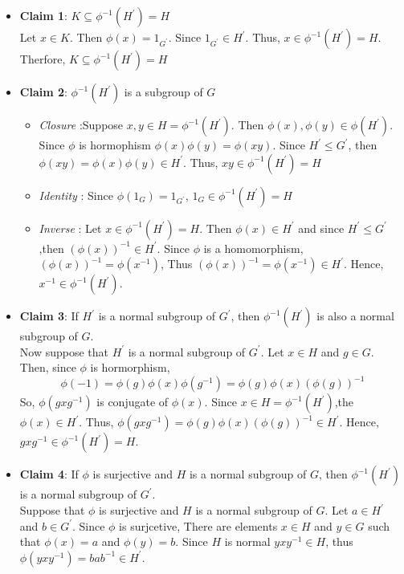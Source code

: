 \documentclass[
]{book}
\providecommand{\tightlist}{%
  \setlength{\itemsep}{0pt}\setlength{\parskip}{0pt}}
\begin{document}
\begin{itemize}
\tightlist
\item
  \textbf{Claim 1}: \(K\subseteq \phi^{-1}(H^\prime)=H\)\\
  Let \(x\in K\). Then \(\phi(x)=1_{G^\prime}\). Since
  \(1_{G^\prime}\in H^\prime\). Thus, \(x\in \phi^{-1}(H^\prime)=H\).
  Therfore, \(K\subseteq \phi^{-1}(H^\prime)=H\)
\item
  \textbf{Claim 2}: \(\phi^{-1}(H^\prime)\) is a subgroup of \(G\)\\

  \begin{itemize}
  \tightlist
  \item
    \emph{Closure} :Suppose \(x,y\in H= \phi^{-1}(H^\prime)\). Then
    \(\phi(x),\phi(y)\in \phi(H^\prime)\). Since \(\phi\) is hormophism
    \(\phi(x)\phi(y)=\phi(xy)\). Since \(H^\prime\leq G^\prime\), then
    \(\phi(xy)=\phi(x)\phi(y)\in H^\prime\). Thus,
    \(xy\in \phi^{-1}(H^\prime)=H\)
  \item
    \emph{Identity} : Since \(\phi(1_G)=1_{G^\prime}\),
    \(1_G\in \phi^{-1}(H^\prime)=H\)
  \item
    \emph{Inverse} : Let \(x\in \phi^{-1}(H^\prime)=H\). Then
    \(\phi(x)\in H^\prime\) and since \(H^\prime \leq G^\prime\),then
    \((\phi(x))^{-1}\in H^\prime\). Since \(\phi\) is a homomorphism,
    \((\phi(x))^{-1}=\phi(x^{-1})\), Thus
    \((\phi(x))^{-1}=\phi(x^{-1})\in H^\prime\). Hence,
    \(x^{-1}\in \phi^{-1}(H^\prime)\).
  \end{itemize}
\item
  \textbf{Claim 3}: If \(H^\prime\) is a normal subgroup of
  \(G^\prime\), then \(\phi^{-1}(H^\prime)\) is also a normal subgroup
  of \(G\).\\
  Now suppose that \(H^\prime\) is a normal subgroup of \(G^\prime\).
  Let \(x\in H\) and \(g\in G\). Then, since \(\phi\) is hormorphism,
  \[\phi(-1)=\phi(g)\phi(x)\phi(g^{-1})=\phi(g)\phi(x)(\phi(g))^{-1}\]
  So, \(\phi(gxg^{-1})\) is conjugate of \(\phi(x)\). Since
  \(x\in H=\phi^{-1}(H^\prime)\),the \(\phi(x)\in H^\prime\). Thus,
  \(\phi(gxg^{-1})=\phi(g)\phi(x)(\phi(g))^{-1}\in H^\prime\). Hence,
  \(gxg^{-1}\in \phi^{-1}(H^\prime)=H\).
\item
  \textbf{Claim 4}: If \(\phi\) is surjective and \(H\) is a normal
  subgroup of \(G\), then \(\phi^{-1}(H^\prime)\) is a normal subgroup
  of \(G^\prime\).\\
  Suppose that \(\phi\) is surjective and \(H\) is a normal subgroup of
  \(G\). Let \(a\in H^\prime\) and \(b\in G^\prime\). Since \(\phi\) is
  surjcetive, There are elements \(x\in H\) and \(y\in G\) such that
  \(\phi(x) = a\) and \(\phi(y) = b\). Since \(H\) is normal
  \(yxy^{- 1}\in H\), thus \(\phi(yxy^{-1})=bab^{-1}\in H^\prime\).
\end{itemize}
\end{document}
